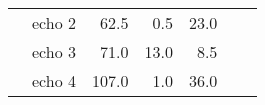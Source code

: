\begin{table}[H]
{\begin{tabular}{|c|c|r|r|r|r|r|}
                                                                                 & echo 2   & 62.5                                                                               & 0.5                                                                                   & 23.0                                                                               &                                                                                           &                                                                                           \\ \cline{2-5}
                                                                                 & echo 3   & 71.0                                                                               & 13.0                                                                                  & 8.5                                                                                &                                                                                           &                                                                                           \\ \cline{2-5}
                                                                                 & echo 4   & 107.0                                                                              & 1.0                                                                                   & 36.0                                                                               &                                                                                           &                                                                                           \\ \hline
    \end{tabular}%
    }
    \end{table}